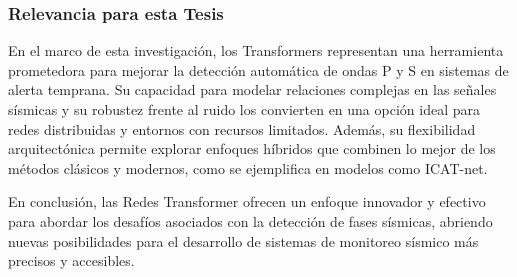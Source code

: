 \subsubsection{Relevancia para esta Tesis}

En el marco de esta investigación, los Transformers representan una herramienta prometedora para mejorar la detección automática de ondas P y S en sistemas de alerta temprana. Su capacidad para modelar relaciones complejas en las señales sísmicas y su robustez frente al ruido los convierten en una opción ideal para redes distribuidas y entornos con recursos limitados. Además, su flexibilidad arquitectónica permite explorar enfoques híbridos que combinen lo mejor de los métodos clásicos y modernos, como se ejemplifica en modelos como ICAT-net.

En conclusión, las Redes Transformer ofrecen un enfoque innovador y efectivo para abordar los desafíos asociados con la detección de fases sísmicas, abriendo nuevas posibilidades para el desarrollo de sistemas de monitoreo sísmico más precisos y accesibles.

